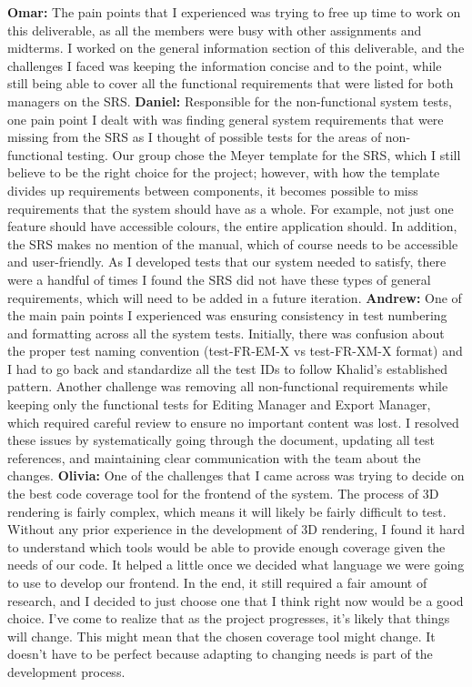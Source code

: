 \documentclass[12pt, titlepage]{article}
\begin{document}
\begin{enumerate}
\textbf{Omar: } The pain points that I experienced was trying to free up time to work on this deliverable, as all the members were busy with other assignments and midterms. I worked on the general information section of this deliverable, and the challenges I faced was keeping the information concise and to the point, while still being able to cover all the functional requirements that were listed for both managers on the SRS.
\newline
\newline
\textbf{Daniel: }Responsible for the non-functional system tests, one pain point I dealt with was finding general system requirements that were missing from the SRS as I thought of possible tests for the areas of non-functional testing. Our group chose the Meyer template for the SRS, which I still believe to be the right choice for the project; however, with how the template divides up requirements between components, it becomes possible to miss requirements that the system should have as a whole. For example, not just one feature should have accessible colours, the entire application should. In addition, the SRS makes no mention of the manual, which of course needs to be accessible and user-friendly. As I developed tests that our system needed to satisfy, there were a handful of times I found the SRS did not have these types of general requirements, which will need to be added in a future iteration. 
\newline
\newline
\textbf{Andrew: } One of the main pain points I experienced was ensuring consistency in test numbering and formatting across all the system tests. Initially, there was confusion about the proper test naming convention (test-FR-EM-X vs test-FR-XM-X format) and I had to go back and standardize all the test IDs to follow Khalid's established pattern. Another challenge was removing all non-functional requirements while keeping only the functional tests for Editing Manager and Export Manager, which required careful review to ensure no important content was lost. I resolved these issues by systematically going through the document, updating all test references, and maintaining clear communication with the team about the changes.
\newline
\newline
\textbf{Olivia: } One of the challenges that I came across was trying to decide on the best code coverage tool for the frontend of the system. The process of 3D rendering is fairly complex, which means it will likely be fairly difficult to test. Without any prior experience in the development of 3D rendering, I found it hard to understand which tools would be able to provide enough coverage given the needs of our code. It helped a little once we decided what language we were going to use to develop our frontend. In the end, it still required a fair amount of research, and I decided to just choose one that I think right now would be a good choice. I’ve come to realize that as the project progresses, it’s likely that things will change. This might mean that the chosen coverage tool might change. It doesn’t have to be perfect because adapting to changing needs is part of the development process.

\end{enumerate}
\end{document}

